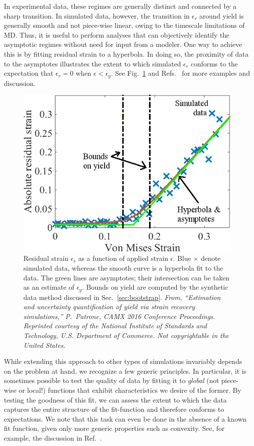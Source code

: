In experimental data, these regimes are generally distinct and connected by a sharp transition.  In simulated data, however, the transition in $\epsilon_r$ around yield is generally smooth and not piece-wise linear, owing to the timescale limitations of MD.  Thus, it is useful to perform analyses that can objectively identify the asymptotic regimes without need for input from a modeler.  One way to achieve this is by fitting residual strain to a hyperbola.  In doing so, the proximity of data to the asymptotes illustrates the extent to which simulated $\epsilon_r$ conforms to the expectation that $\epsilon_r=0$ when $\epsilon < \epsilon_y$.  See Fig.~\ref{fig:yield} and Refs.~\cite{patrone1,patrone2} for more examples and discussion.

\begin{figure}
  \centering
  \includegraphics[width=0.9\linewidth]{figures/hyperbola.png}
  \caption{Residual strain $\epsilon_r$ as a function of applied strain $\epsilon$.  Blue $\times$ denote simulated data, whereas the smooth curve is a hyperbola fit to the data.  The green lines are asymptotes; their intersection can be taken as an estimate of $\epsilon_y$.    Bounds on yield are computed by the synthetic data method discussed in Sec.~\ref{sec:bootstrap}. {\it From, ``Estimation and uncertainty quantification of yield via strain recovery simulations,'' P.\ Patrone, CAMX 2016 Conference Proceedings.  Reprinted courtesy of the National Institute of Standards and Technology, U.S. Department of Commerce. Not copyrightable in the United States.}}
  \label{fig:yield}
\end{figure}

While extending this approach to other types of simulations invariably depends on the problem at hand, we recognize a few generic principles.  In particular, it is sometimes possible to test the quality of data by fitting it to {\it global} (not piece-wise or local!) functions that exhibit characteristics we desire of the former.  By testing the goodness of this fit, we can assess the extent to which the data captures the entire structure of the fit-function and therefore conforms to expectations.  We note that this task can even be done in the absence of a known fit function, given only more generic properties such as convexity.  See, for example, the discussion in Ref.~\cite{PatroneAIAA}.


